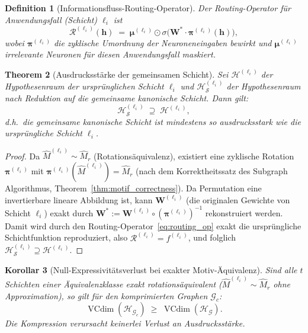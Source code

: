 \documentclass[12pt, a4paper, openany]{report}
\newtheorem{theorem}{Theorem}[chapter]
\newtheorem{corollary}[theorem]{Korollar}
\newtheorem{definition}[theorem]{Definition}
\newcommand{\calG}{\mathcal{G}}
\newcommand{\calH}{\mathcal{H}}
\newcommand{\calR}{\mathcal{R}}
\newcommand{\calS}{\mathcal{S}}
\DeclareMathOperator{\VC}{VCdim}
\begin{document}
\begin{definition}[Informationsfluss-Routing-Operator]
\label{def:routing}
Der \emph{Routing-Operator} für Anwendungsfall (Schicht) $\ell_i$ ist
\begin{equation}
  \label{eq:routing_op}
  \calR^{(\ell_i)}(\bm{h})
  \;=\;
  \bm{\mu}^{(\ell_i)} \odot
  \sigma\!\bigl(\bm{W}^* \cdot \bm{\pi}^{(\ell_i)}(\bm{h})\bigr),
\end{equation}
wobei $\bm{\pi}^{(\ell_i)}$ die zyklische Umordnung der Neuroneneingaben
bewirkt und $\bm{\mu}^{(\ell_i)}$ irrelevante Neuronen für diesen
Anwendungsfall maskiert.
\end{definition}

\begin{theorem}[Ausdrucksstärke der gemeinsamen Schicht]
\label{thm:shared_expressivity}
Sei $\calH^{(\ell_i)}$ der Hypothesenraum der ursprünglichen Schicht $\ell_i$
und $\calH_{\calS}^{(\ell_i)}$ der Hypothesenraum nach Reduktion auf die
gemeinsame kanonische Schicht.  Dann gilt:
\begin{equation}
  \label{eq:expr_preservation}
  \calH_{\calS}^{(\ell_i)} \;\supseteq\; \calH^{(\ell_i)},
\end{equation}
d.h.\ die gemeinsame kanonische Schicht ist mindestens so ausdrucksstark wie
die ursprüngliche Schicht $\ell_i$.
\end{theorem}

\begin{proof}
Da $\hat{M}^{(\ell_i)} \sim \hat{M}_r$ (Rotationsäquivalenz), existiert eine
zyklische Rotation $\bm{\pi}^{(\ell_i)}$ mit
$\bm{\pi}^{(\ell_i)}(\hat{M}^{(\ell_i)}) = \hat{M}_r$ (nach dem
Korrektheitssatz des Subgraph Algorithmus, Theorem~\ref{thm:motif_correctness}).
Da Permutation eine invertierbare lineare Abbildung ist, kann
$\bm{W}^{(\ell_i)}$ (die originalen Gewichte von Schicht $\ell_i$) exakt durch
$\bm{W}^* := \bm{W}^{(\ell_i)} \circ (\bm{\pi}^{(\ell_i)})^{-1}$ rekonstruiert
werden.  Damit wird durch den Routing-Operator~\eqref{eq:routing_op} exakt
die ursprüngliche Schichtfunktion reproduziert, also
$\calR^{(\ell_i)} = f^{(\ell_i)}$, und folglich
$\calH_{\calS}^{(\ell_i)} \supseteq \calH^{(\ell_i)}$.
\end{proof}

\begin{corollary}[Null-Expressivitätsverlust bei exakter Motiv-Äquivalenz]
\label{cor:no_loss}
Sind alle $t$ Schichten einer Äquivalenzklasse exakt rotationsäquivalent
($\hat{M}^{(\ell_i)} \sim \hat{M}_r$ ohne Approximation), so gilt für den
komprimierten Graphen $\calG_c$:
\[
  \VC(\calH_{\calG_c}) \;\geq\; \VC(\calH_{\calG}).
\]
Die Kompression verursacht keinerlei Verlust an Ausdrucksstärke.
\end{corollary}
\end{document}
